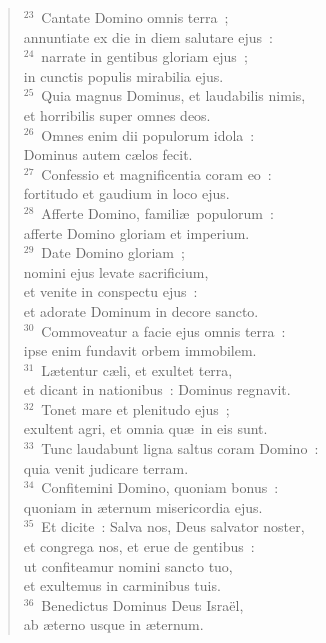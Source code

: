 \begin{flushleft}
\begin{verse}
${}^{23}$~Cantate Domino omnis terra~;\\ annuntiate ex die in diem salutare ejus~:\\
${}^{24}$~narrate in gentibus gloriam ejus~;\\ in cunctis populis mirabilia ejus.\\
${}^{25}$~Quia magnus Dominus, et laudabilis nimis,\\ et horribilis super omnes deos.\\
${}^{26}$~Omnes enim dii populorum idola~:\\ Dominus autem c\ae los fecit.\\
${}^{27}$~Confessio et magnificentia coram eo~:\\ fortitudo et gaudium in loco ejus.\\
${}^{28}$~Afferte Domino, famili\ae\ populorum~:\\ afferte Domino gloriam et imperium.\\
${}^{29}$~Date Domino gloriam~;\\ nomini ejus levate sacrificium,\\ et venite in conspectu ejus~:\\ et adorate Dominum in decore sancto.\\
${}^{30}$~Commoveatur a facie ejus omnis terra~:\\ ipse enim fundavit orbem immobilem.\\
${}^{31}$~L\ae tentur c\ae li, et exultet terra,\\ et dicant in nationibus~: Dominus regnavit.\\
${}^{32}$~Tonet mare et plenitudo ejus~;\\ exultent agri, et omnia qu\ae\ in eis sunt.\\
${}^{33}$~Tunc laudabunt ligna saltus coram Domino~:\\ quia venit judicare terram.\\
${}^{34}$~Confitemini Domino, quoniam bonus~:\\ quoniam in \ae ternum misericordia ejus.\\
${}^{35}$~Et dicite~: Salva nos, Deus salvator noster,\\ et congrega nos, et erue de gentibus~:\\ ut confiteamur nomini sancto tuo,\\ et exultemus in carminibus tuis.\\
${}^{36}$~Benedictus Dominus Deus Isra\"el,\\ ab \ae terno usque in \ae ternum.\end{verse}\end{flushleft}

